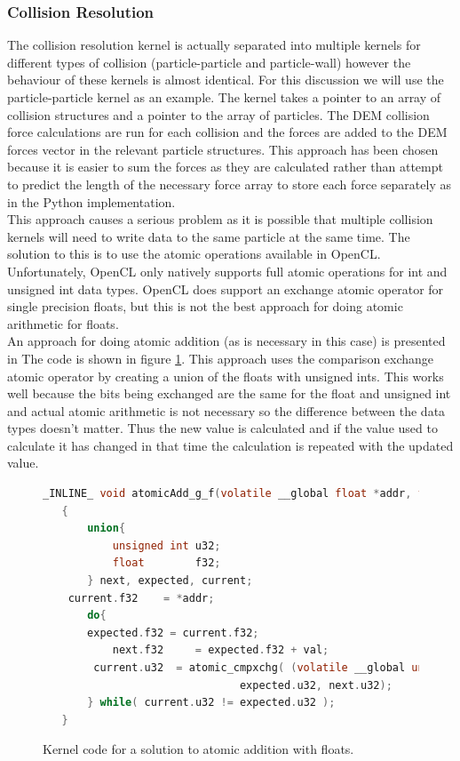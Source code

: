 \documentclass[10pt,a4paper,titlepage]{report}
\begin{document}
\subsubsection{Collision Resolution}
\label{sec:Collision Resolution}
The collision resolution kernel is actually separated into multiple kernels for different types of collision (particle-particle and particle-wall) however the behaviour of these kernels is almost identical. For this discussion we will use the particle-particle kernel as an example. The kernel takes a pointer to an array of collision structures and a pointer to the array of particles. The DEM collision force calculations are run for each collision and the forces are added to the DEM forces vector in the relevant particle structures. This approach has been chosen because it is easier to sum the forces as they are calculated rather than attempt to predict the length of the necessary force array to store each force separately as in the Python implementation.
\\This approach causes a serious problem as it is possible that multiple collision kernels will need to write data to the same particle at the same time. The solution to this is to use the atomic operations available in OpenCL. Unfortunately, OpenCL only natively supports full atomic operations for int and unsigned int data types. OpenCL does support an exchange atomic operator for single precision floats, but this is not the best approach for doing atomic arithmetic for floats.
\\An approach for doing atomic addition (as is necessary in this case) is presented in %
The code is shown in figure \ref{fig:atomic_float_addition}. This approach uses the comparison exchange atomic operator by creating a union of the floats with unsigned ints. This works well because the bits being exchanged are the same for the float and unsigned int and actual atomic arithmetic is not necessary so the difference between the data types doesn't matter. Thus the new value is calculated and if the value used to calculate it has changed in that time the calculation is repeated with the updated value.
\begin{figure}[!ht]
\begin{lstlisting}[language=C]
 _INLINE_ void atomicAdd_g_f(volatile __global float *addr, float val)
   {
       union{
           unsigned int u32;
           float        f32;
       } next, expected, current;
   	current.f32    = *addr;
       do{
   	   expected.f32 = current.f32;
           next.f32     = expected.f32 + val;
   		current.u32  = atomic_cmpxchg( (volatile __global unsigned int *)addr, 
                               expected.u32, next.u32);
       } while( current.u32 != expected.u32 );
   }
\end{lstlisting}
\caption{Kernel code for a solution to atomic addition with floats.}
\label{fig:atomic_float_addition}
\end{figure}
\end{document}
